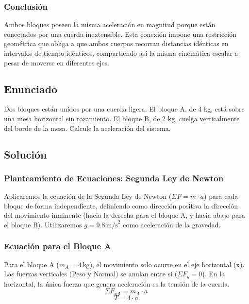 \documentclass[12pt]{article}
\begin{document}
\subsubsection*{Conclusión}
Ambos bloques poseen la misma aceleración en magnitud porque están conectados por una cuerda inextensible. Esta conexión impone una restricción geométrica que obliga a que ambos cuerpos recorran distancias idénticas en intervalos de tiempo idénticos, compartiendo así la misma cinemática escalar a pesar de moverse en diferentes ejes.

\newpage

\subsection*{Enunciado}
Dos bloques están unidos por una cuerda ligera. El bloque A, de 4 kg, está sobre una mesa horizontal sin rozamiento. El bloque B, de 2 kg, cuelga verticalmente del borde de la mesa. Calcule la aceleración del sistema.

\subsection*{Solución}

\subsubsection*{Planteamiento de Ecuaciones: Segunda Ley de Newton}
Aplicaremos la ecuación de la Segunda Ley de Newton ($\Sigma F = m \cdot a$) para cada bloque de forma independiente, definiendo como dirección positiva la dirección del movimiento inminente (hacia la derecha para el bloque A, y hacia abajo para el bloque B). Utilizaremos $g = 9.8 \, \text{m/s}^2$ como aceleración de la gravedad.

\subsubsection*{Ecuación para el Bloque A}
Para el bloque A ($m_A = 4 \, \text{kg}$), el movimiento solo ocurre en el eje horizontal (x). Las fuerzas verticales (Peso y Normal) se anulan entre sí ($\Sigma F_y = 0$). En la horizontal, la única fuerza que genera aceleración es la tensión de la cuerda.
\begin{equation}
    \Sigma F_{xA} = m_A \cdot a
\end{equation}
\begin{equation}
    T = 4 \cdot a 
\end{equation}
\end{document}
